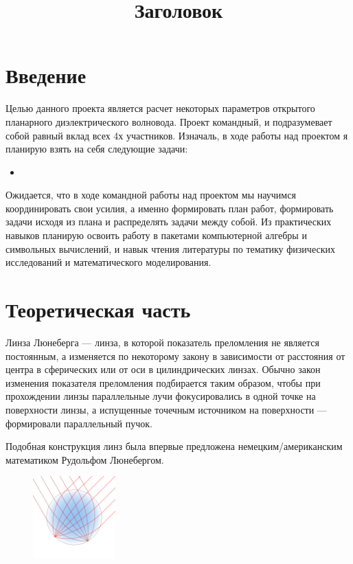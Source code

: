 \documentclass{article}
\title{Заголовок}
\begin{document}
\tableofcontents

\newpage

\section{Введение}

Целью данного проекта является расчет некоторых параметров открытого планарного диэлектрического волновода.
Проект командный, и подразумевает собой равный вклад всех 4х участников. Изначаль, в ходе работы над проектом я планирую взять на себя следующие задачи:
\begin{itemize}
    \item 
\end{itemize}

Ожидается, что в ходе командной работы над проектом мы научимся координировать свои усилия, а именно формировать план работ, формировать задачи исходя из плана и распределять задачи между собой. Из практических навыков планирую освоить работу в пакетами компьютерной алгебры и символьных вычислений, и навык чтения литературы по тематику физических исследований и математического моделирования.

\newpage

\section{Теоретическая часть}

Линза Люнеберга — линза, в которой показатель преломления не является постоянным, а изменяется по некоторому закону в зависимости от расстояния от центра в сферических или от оси в цилиндрических линзах. Обычно закон изменения показателя преломления подбирается таким образом, чтобы при прохождении линзы параллельные лучи фокусировались в одной точке на поверхности линзы, а испущенные точечным источником на поверхности — формировали параллельный пучок.

Подобная конструкция линз была впервые предложена немецким/американским математиком Рудольфом Люнебергом.\\[10pt]



\begin{figure}[H]
    \centering
    \includegraphics[width=120]{image3.png}
    \caption{}
    \label{tok_per_tweet}
\end{figure}
\end{document}
